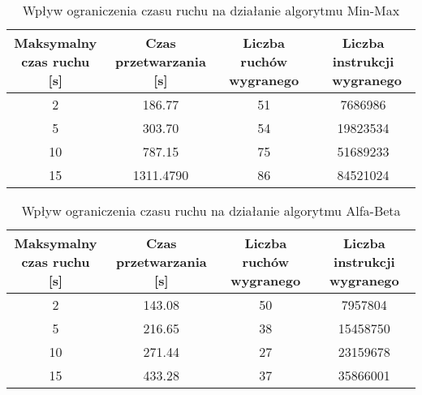 \documentclass[a4paper,10pt]{article}
\begin{document}
    \begin{table}[H]
    \caption{Wpływ ograniczenia czasu ruchu na działanie algorytmu Min-Max}
    \label{minmax_depth}
    \begin{center}
    \begin{tabular}{|c|c|c|c|}
    \hline
    \thead{Maksymalny \\ czas ruchu [s]} & \thead{Czas \\ przetwarzania [s]} & \thead{Liczba ruchów  \\ wygranego} & \thead{Liczba instrukcji \\\ wygranego} \\
    \hline
    {2} & \makecell{}186.77 & \makecell{}51 & \makecell{}7686986 \\
    \hline
    {5} & \makecell{}303.70 & \makecell{}54 & \makecell{}19823534 \\ 
    \hline
    {10} & \makecell{}787.15 & \makecell{}75 & \makecell{}51689233 \\ 
    \hline
    {15} & \makecell{}1311.4790 & \makecell{}86 & \makecell{}84521024 \\ 
    \hline
    \end{tabular}
    \end{center}
     \end{table}
     
    \begin{table}[H]
    \caption{Wpływ ograniczenia czasu ruchu na działanie algorytmu Alfa-Beta}
    \label{minmax_depth}
    \begin{center}
    \begin{tabular}{|c|c|c|c|}
    \hline
    \thead{Maksymalny \\ czas ruchu [s]} & \thead{Czas \\ przetwarzania [s]} & \thead{Liczba ruchów  \\ wygranego} & \thead{Liczba instrukcji \\ wygranego} \\
    \hline
    {2} & \makecell{}143.08 & \makecell{}50 & \makecell{}7957804 \\
    \hline
    {5} & \makecell{}216.65 & \makecell{}38 & \makecell{}15458750 \\ 
    \hline
    {10} & \makecell{}271.44 & \makecell{}27 & \makecell{}23159678\\ 
    \hline
    {15} & \makecell{}433.28 & \makecell{}37 & \makecell{}35866001 \\ 
    \hline
    \end{tabular}
    \end{center}
     \end{table}
     
\end{document}
